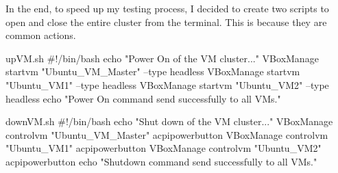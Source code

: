 In the end, to speed up my testing process, I decided to create two scripts to open and close the entire cluster from the terminal. This is because they are common actions.

\begin{codice}[style=bashstyle]{upVM.sh}
    #!/bin/bash
    echo "Power On of the VM cluster..."
    VBoxManage startvm "Ubuntu_VM_Master" --type headless
    VBoxManage startvm "Ubuntu_VM1" --type headless
    VBoxManage startvm "Ubuntu_VM2" --type headless
    echo "Power On command send successfully to all VMs."
\end{codice}

\begin{codice}[style=bashstyle]{downVM.sh}
    #!/bin/bash
    echo "Shut down of the VM cluster..."
    VBoxManage controlvm "Ubuntu_VM_Master" acpipowerbutton
    VBoxManage controlvm "Ubuntu_VM1" acpipowerbutton
    VBoxManage controlvm "Ubuntu_VM2" acpipowerbutton
    echo "Shutdown command send successfully to all VMs."
\end{codice}


